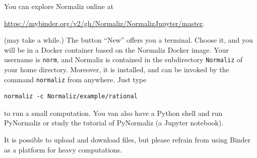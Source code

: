 You can explore Normaliz online at
\begin{center}
	\url{https://mybinder.org/v2/gh/Normaliz/NormalizJupyter/master}.
\end{center}
(may take a while.) The button ``New'' offers you a terminal. Choose it, and you will be in a Docker container based on the Normaliz Docker image. Your username is \verb|norm|, and Normaliz is contained in the subdirectory \verb|Normaliz| of your home directory. Moreover, it is installed, and can be invoked by the command \verb|normaliz| from anywhere. Just type
\begin{Verbatim}
normaliz -c Normaliz/example/rational
\end{Verbatim}
to run a small computation. You van also have a Python shell and run PyNormaliz or study the tutorial of PyNormaliz (a Jupyter notebook).

It is possible to upload and download files, but please refrain from using Binder as a platform for heavy computations.

